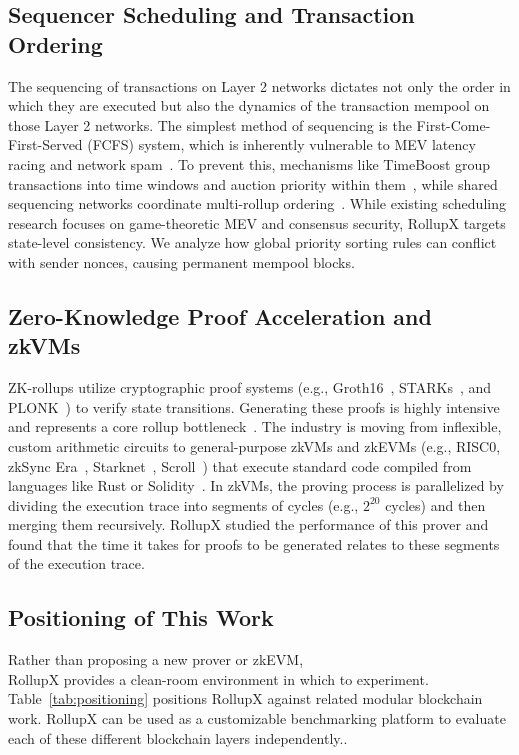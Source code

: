 \subsection{Sequencer Scheduling and Transaction Ordering}
The sequencing of transactions on Layer 2 networks dictates not only the order in which they are executed but also the dynamics of the transaction mempool on those Layer 2 networks. The simplest method of sequencing is the First-Come-First-Served (FCFS) system, which is inherently vulnerable to MEV latency racing and network spam~\cite{motepalli2023sequencers}. To prevent this, mechanisms like TimeBoost group transactions into time windows and auction priority within them~\cite{timeboost_docs}, while shared sequencing networks coordinate multi-rollup ordering~\cite{motepalli2023sequencers}. While existing scheduling research focuses on game-theoretic MEV and consensus security, RollupX targets state-level consistency. We analyze how global priority sorting rules can conflict with sender nonces, causing permanent mempool blocks.

\subsection{Zero-Knowledge Proof Acceleration and zkVMs}
ZK-rollups utilize cryptographic proof systems (e.g., Groth16~\cite{groth2016snark}, STARKs~\cite{bensasson2018stark}, and PLONK~\cite{gabizon2019plonk}) to verify state transitions. Generating these proofs is highly intensive and represents a core rollup bottleneck~\cite{bez2023empirical, werner2024analyzing}. The industry is moving from inflexible, custom arithmetic circuits to general-purpose zkVMs and zkEVMs (e.g., RISC0, zkSync Era~\cite{zksync_era_docs}, Starknet~\cite{starknet_docs}, Scroll~\cite{scroll_docs}) that execute standard code compiled from languages like Rust or Solidity~\cite{lavaur2023modular, habib2025bottlenecks}. In zkVMs, the proving process is parallelized by dividing the execution trace into segments of cycles (e.g., \(2^{20}\) cycles) and then merging them recursively. RollupX studied the performance of this prover and found that the time it takes for proofs to be generated relates to these segments of the execution trace.

\subsection{Positioning of This Work}
Rather than proposing a new prover or zkEVM,\\ RollupX provides a clean-room environment in which to experiment. Table~\ref{tab:positioning} positions RollupX against related modular blockchain work. RollupX can be used as a customizable benchmarking platform to evaluate each of these different blockchain layers independently..

